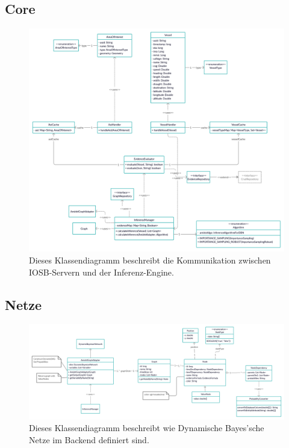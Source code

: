 \documentclass{article}
\begin{document}
\subsection{Core}
\begin{figure}[ht!]
    \includegraphics[width=\textwidth,height=\textheight,keepaspectratio]{image/Core.png}
    \caption{Dieses Klassendiagramm beschreibt die Kommunikation zwischen IOSB-Servern und der Inferenz-Engine.}
\end{figure}

\newpage
\subsection{Netze}
\begin{figure}[ht!]
    \includegraphics[width=\textwidth,height=\textheight,keepaspectratio]{image/Network.png}
    \caption{Dieses Klassendiagramm beschreibt wie Dynamische Bayes'sche Netze im Backend definiert sind. }
\end{figure}
\end{document}
